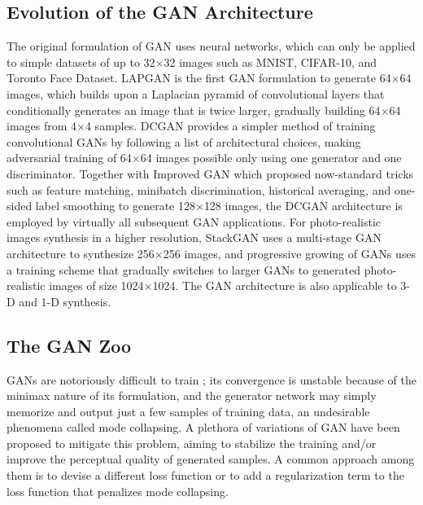 \subsection{Evolution of the GAN Architecture}

The original formulation of GAN uses neural networks, which can only be applied to simple datasets of up to 32$\times$32 images such as MNIST, CIFAR-10, and Toronto Face Dataset.
LAPGAN \cite{denton2015lapgan} is the first GAN formulation to generate 64$\times$64 images, which builds upon a Laplacian pyramid of convolutional layers that conditionally generates an image that is twice larger, gradually building 64$\times$64 images from 4$\times$4 samples.
DCGAN \cite{radford2015dcgan} provides a simpler method of training convolutional GANs by following a list of architectural choices, making adversarial training of 64$\times$64 images possible only using one generator and one discriminator.
Together with Improved GAN \cite{salimans2016improved} which proposed now-standard tricks such as feature matching, minibatch discrimination, historical averaging, and one-sided label smoothing to generate 128$\times$128 images, the DCGAN architecture is employed by virtually all subsequent GAN applications.
For photo-realistic images synthesis in a higher resolution, StackGAN \cite{zhang2017stackgan2} uses a multi-stage GAN architecture to synthesize 256$\times$256 images, and progressive growing of GANs \cite{karras2017pggan} uses a training scheme that gradually switches to larger GANs to generated photo-realistic images of size 1024$\times$1024.
The GAN architecture is also applicable to 3-D \cite{wu2016gan} and 1-D \cite{donahue2018wavegan} synthesis.


\subsection{The GAN Zoo}

GANs are notoriously difficult to train \cite{arjovsky2017principled}; its convergence is unstable because of the minimax nature of its formulation, and the generator network may simply memorize and output just a few samples of training data, an undesirable phenomena called mode collapsing.
A plethora of variations of GAN have been proposed to mitigate this problem, aiming to stabilize the training and/or improve the perceptual quality of generated samples.
A common approach among them is to devise a different loss function or to add a regularization term to the loss function that penalizes mode collapsing.

